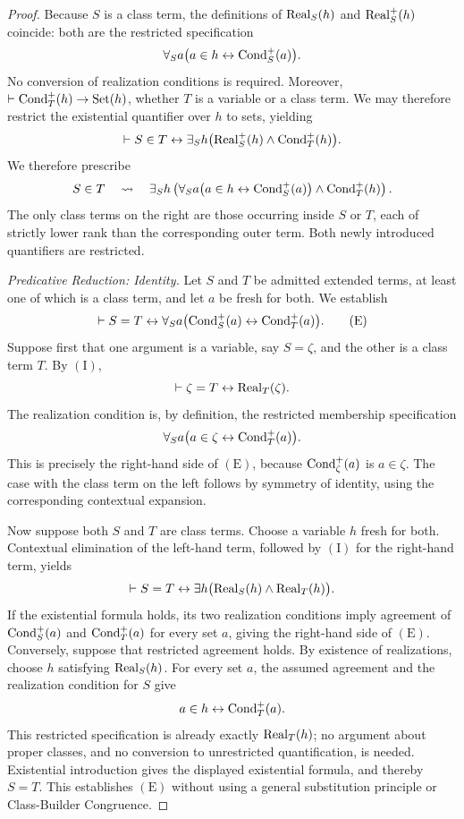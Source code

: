 \begin{proof}
Because \(S\) is a class term, the definitions of
\(\operatorname{Real}_S(h)\) and \(\operatorname{Real}_S^+(h)\) coincide: both are the
restricted specification
\[
\forall_S a\bigl(a\in h\leftrightarrow\operatorname{Cond}_S^+(a)\bigr).
\]
No conversion of realization conditions is required. Moreover,
\(\vdash\operatorname{Cond}_T^+(h)\to\operatorname{Set}(h)\), whether \(T\) is a variable
or a class term. We may therefore restrict the existential
quantifier over \(h\) to sets, yielding
\[
\vdash
S\in T
\leftrightarrow
\exists_S h\bigl(
\operatorname{Real}^+_S(h)\land \operatorname{Cond}_T^{+}(h)
\bigr).
\]
We therefore prescribe
\[
S\in T
\quad\rightsquigarrow\quad
\exists_S h\left(
\forall_S a\bigl(a\in h\leftrightarrow \operatorname{Cond}_S^+(a)\bigr)
\land \operatorname{Cond}_T^{+}(h)
\right).
\]
The only class terms on the right are those occurring inside
\(S\) or \(T\), each of strictly lower rank than the corresponding
outer term. Both newly introduced quantifiers are restricted.

\medskip
\noindent\emph{Predicative Reduction: Identity.}
Let \(S\) and \(T\) be admitted extended terms, at least one of
which is a class term, and let \(a\) be fresh for both. We establish
\[
\vdash
S=T
\leftrightarrow
\forall_S a\bigl(\operatorname{Cond}_S^{+}(a)\leftrightarrow \operatorname{Cond}_T^{+}(a)\bigr).
\tag{E}
\]
Suppose first that one argument is a variable, say \(S=\zeta\),
and the other is a class term \(T\). By \((\mathrm{I})\),
\[
\vdash
\zeta=T\leftrightarrow\operatorname{Real}_T(\zeta).
\]
The realization condition is, by definition, the restricted
membership specification
\[
\forall_S a\bigl(a\in\zeta\leftrightarrow \operatorname{Cond}_T^{+}(a)\bigr).
\]
This is precisely the right-hand side of \((\mathrm{E})\), because
\(\operatorname{Cond}_\zeta^+(a)\) is \(a\in\zeta\). The case with the class term on
the left follows by symmetry of identity, using the corresponding
contextual expansion.

Now suppose both \(S\) and \(T\) are class terms. Choose a
variable \(h\) fresh for both. Contextual elimination of the
left-hand term, followed by \((\mathrm{I})\) for the right-hand
term, yields
\[
\vdash
S=T
\leftrightarrow
\exists h\bigl(\operatorname{Real}_S(h)\land\operatorname{Real}_T(h)\bigr).
\]
If the existential formula holds, its two realization conditions
imply agreement of \(\operatorname{Cond}_S^+(a)\) and \(\operatorname{Cond}_T^{+}(a)\) for every set
\(a\), giving the right-hand side of \((\mathrm{E})\).
Conversely, suppose that restricted agreement holds. By existence
of realizations, choose \(h\) satisfying \(\operatorname{Real}_S(h)\).
For every set \(a\), the assumed agreement and the realization
condition for \(S\) give
\[
a\in h\leftrightarrow \operatorname{Cond}_T^{+}(a).
\]
This restricted specification is already exactly
\(\operatorname{Real}_T(h)\); no argument about proper classes, and no
conversion to unrestricted quantification, is needed.
Existential introduction gives the displayed existential formula,
and thereby \(S=T\). This establishes \((\mathrm{E})\) without
using a general substitution principle or Class-Builder Congruence.


\end{proof}
